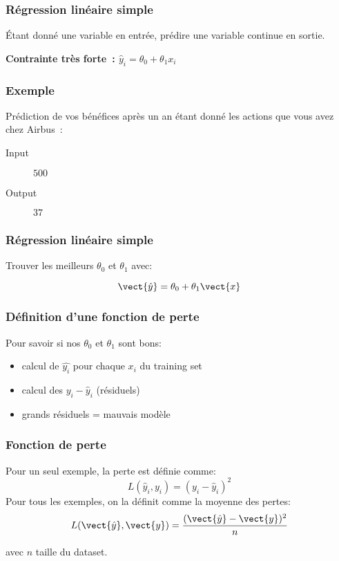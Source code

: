 \documentclass{formation}
\begin{document}
\begin{frame}
  \frametitle{Régression linéaire simple}
  Étant donné une variable en entrée, prédire une variable continue en
  sortie.

  \textbf{Contrainte très forte : $\hat{y}_i = \theta_0+\theta_1 x_i$}

\end{frame}
\begin{frame}
  \frametitle{Exemple}

  Prédiction de vos bénéfices après un an étant donné les actions que
  vous avez chez Airbus :
  \begin{description}
  \item[Input] $500$
  \item[Output] $37$
  \end{description}
\end{frame}

\begin{frame}
  \frametitle{Régression linéaire simple}

  Trouver les meilleurs $\theta_0$ et $\theta_1$ avec:

  \[
    \vect{\hat{y}} = \theta_0 + \theta_1\vect{x}
  \]
\end{frame}

\begin{frame}
  \frametitle{Définition d'une fonction de perte}

  Pour savoir si nos $\theta_0$ et $\theta_1$ sont bons:

  \begin{itemize}[<+->]
  \item calcul de $\hat{y_i}$ pour chaque $x_i$ du training set
  \item calcul des $y_i - \hat{y}_i$ (résiduels)
  \item grands résiduels = mauvais modèle
  \end{itemize}
\end{frame}

\begin{frame}
  \frametitle{Fonction de perte}

  Pour un seul exemple, la perte est définie comme:
  \[
    L(\hat{y}_i, y_i) = (y_i - \hat{y}_i)^2
  \]
  Pour tous les exemples, on la définit comme la moyenne des pertes:
  \[
    L(\vect{\hat{y}}, \vect{y}) = \frac{(\vect{\hat{y}} - \vect{y})^2}{n}
  \]

  avec $n$ taille du dataset.
\end{frame}
\end{document}
